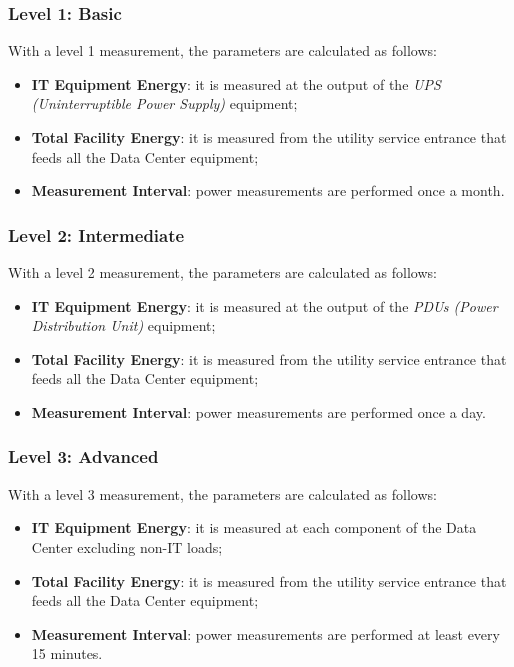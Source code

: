 \subsubsection{Level 1: Basic}
With a level 1 measurement, the parameters are calculated as follows:
\begin{itemize}
    \item \textbf{IT Equipment Energy}: it is measured at the output of the \emph{UPS (Uninterruptible Power Supply)} equipment;
    \item \textbf{Total Facility Energy}: it is measured from the utility service entrance that feeds all the Data Center equipment;
    \item \textbf{Measurement Interval}: power measurements are performed once a month.
\end{itemize}

\subsubsection{Level 2: Intermediate}
With a level 2 measurement, the parameters are calculated as follows:
\begin{itemize}
    \item \textbf{IT Equipment Energy}: it is measured at the output of the \emph{PDUs (Power Distribution Unit)} equipment;
    \item \textbf{Total Facility Energy}: it is measured from the utility service entrance that feeds all the Data Center equipment;
    \item \textbf{Measurement Interval}: power measurements are performed once a day.
\end{itemize}

\subsubsection{Level 3: Advanced}
With a level 3 measurement, the parameters are calculated as follows:
\begin{itemize}
    \item \textbf{IT Equipment Energy}: it is measured at each component of the Data Center excluding non-IT loads;
    \item \textbf{Total Facility Energy}: it is measured from the utility service entrance that feeds all the Data Center equipment;
    \item \textbf{Measurement Interval}: power measurements are performed at least every 15 minutes.
\end{itemize}

